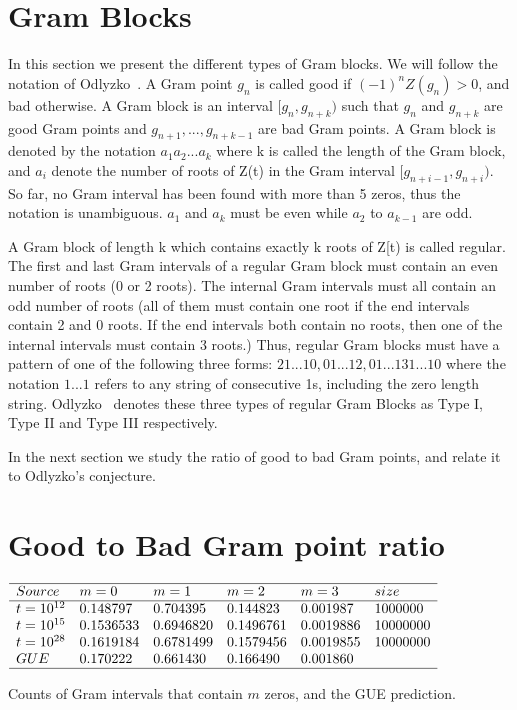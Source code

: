 \documentclass[twoside]{article}
\begin{document}
\section{\label{sec4}Gram Blocks}


In this section we present the different types of Gram blocks. We will follow the notation of   Odlyzko~\cite{Odlyzko 1992}. A Gram point $g_n$ is called good if $(-1)^nZ(g_n) > 0$, and bad otherwise. A Gram block is an interval $[g_n, g_{n+k})$ such that $g_n$  and $g_{n+k}$ are good Gram points 
and $g_{n+1}, . . ., g_{n+k-1}$ are bad Gram points. A Gram block is denoted by the notation $a_1a_2 . . . a_k$ where k is called the length of the Gram block, and $a_i$ denote the number of roots of Z(t) in the Gram interval $[g_{n+i-1}, g_{n+i})$. So far, no Gram interval has been found with more than 5 zeros, thus the notation is unambiguous. $a_1$ and $a_k$ must be even while  $a_2$ to $a_{k-1}$ are odd.

A Gram block of length k which contains exactly k roots of Z[t) is called regular. The first and last Gram intervals of a regular Gram block must contain an even number of roots (0 or 2 roots). The internal Gram intervals must all contain an odd number of roots (all of them must contain one root if the end intervals contain 2 and 0 roots. If the end intervals both contain no roots, then one of the internal intervals must contain 3 roots.) 
Thus, regular Gram blocks must have a pattern of one of the following three forms:
$21 . . . 10, 01 . . . 12, 01 . . . 131 . . . 10$
where the notation $1 . . . 1$ refers to any string of consecutive 1s, including the zero length string. Odlyzko~\cite{Odlyzko 1992} denotes these three types of regular Gram Blocks as Type I, Type II and Type III respectively.  

In the next section we study the ratio of good to bad Gram points, and relate it to Odlyzko's conjecture.

\section{\label{sec5}Good to Bad Gram point ratio}

\begin{table}
\centering \(\begin{array}{llllll}
\hline
Source &m = 0&m = 1&m = 2&m = 3&size\\
\hline
t = 10^{12}&0.148797&0.704395&0.144823&0.001987&1000000\\
t = 10^{15}&0.1536533&0.6946820&0.1496761&0.0019886&10000000\\
t = 10^{28}&0.1619184&0.6781499&0.1579456&0.0019855&10000000\\
 GUE&0.170222&0.661430&0.166490&0.001860&\\
\hline
\end{array}\)
\caption{Counts of Gram intervals that contain $m$ zeros, and the GUE prediction.} \label{tab:intervalzeros}
\end{table}
\end{document}
